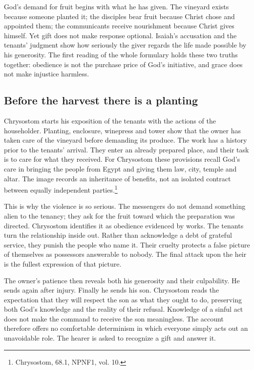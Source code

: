 God's demand for fruit begins with what he has given. The vineyard exists because someone planted it; the disciples bear fruit because Christ chose and appointed them; the communicants receive nourishment because Christ gives himself. Yet gift does not make response optional. Isaiah's accusation and the tenants' judgment show how seriously the giver regards the life made possible by his generosity. The first reading of the whole formulary holds these two truths together: obedience is not the purchase price of God's initiative, and grace does not make injustice harmless.

\subsection{Before the harvest there is a planting}
Chrysostom starts his exposition of the tenants with the actions of the householder. Planting, enclosure, winepress and tower show that the owner has taken care of the vineyard before demanding its produce. The work has a history prior to the tenants' arrival. They enter an already prepared place, and their task is to care for what they received. For Chrysostom these provisions recall God's care in bringing the people from Egypt and giving them law, city, temple and altar. The image records an inheritance of benefits, not an isolated contract between equally independent parties.\footnote{Chrysostom,  68.1, NPNF1, vol. 10.}

This is why the violence is so serious. The messengers do not demand something alien to the tenancy; they ask for the fruit toward which the preparation was directed. Chrysostom identifies it as obedience evidenced by works. The tenants turn the relationship inside out. Rather than acknowledge a debt of grateful service, they punish the people who name it. Their cruelty protects a false picture of themselves as possessors answerable to nobody. The final attack upon the heir is the fullest expression of that picture.

The owner's patience then reveals both his generosity and their culpability. He sends again after injury. Finally he sends his son. Chrysostom reads the expectation that they will respect the son as what they ought to do, preserving both God's knowledge and the reality of their refusal. Knowledge of a sinful act does not make the command to receive the son meaningless. The account therefore offers no comfortable determinism in which everyone simply acts out an unavoidable role. The hearer is asked to recognize a gift and answer it.

